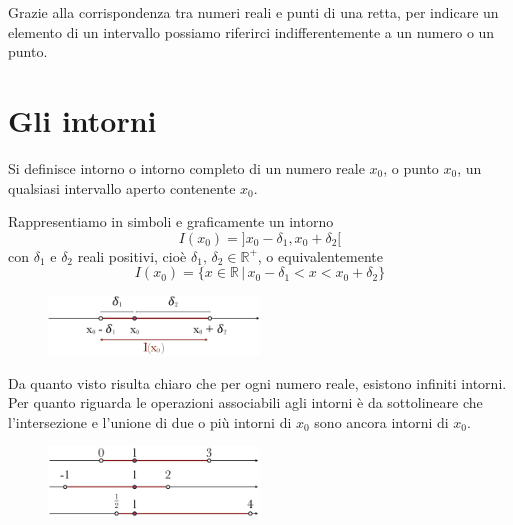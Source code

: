 Grazie alla corrispondenza tra numeri reali e punti di una retta, per 
indicare un elemento di un intervallo possiamo riferirci indifferentemente a 
un numero o un punto.

\section{Gli intorni}
  \begin{definizione}
Si definisce intorno o intorno completo di un numero reale \(x_0\), o punto 
\(x_0\), un qualsiasi intervallo aperto contenente \(x_0\).
  \end{definizione}

Rappresentiamo in simboli e graficamente un intorno
\begin{equation}
I(x_0)=]x_0-\delta_1,x_0+\delta_2[
\end{equation}
con \(\delta_1\) e \(\delta_2\) reali positivi, cioè 
\(\delta_1,\,\delta_2 \in \mathbb{R^+}\), o equivalentemente
\begin{equation}
I(x_0)=\{x\in \mathbb{R}\,\vert\,x_0-\delta_1<x<x_0+\delta_2\}
\end{equation}

  \begin{figure}[h!]
  \centering
  
\includegraphics[width=0.5\textwidth]{img/top_1.png}%
  \end{figure}
  
Da quanto visto risulta chiaro che per ogni numero reale, esistono infiniti 
intorni.\\
Per quanto riguarda le operazioni associabili agli intorni è da sottolineare 
che l'intersezione e l'unione di due o più intorni di \(x_0\) sono ancora 
intorni di \(x_0\).

\begin{figure}[h!]
\centering
\includegraphics[width=0.5\textwidth]{img/top_7.png}%
  \end{figure}
  

